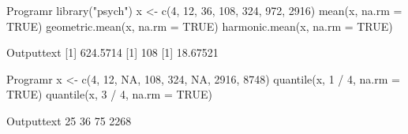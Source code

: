 \begin{code}
    {Program}{r}
library("psych")
x <- c(4, 12, 36, 108, 324, 972, 2916)
mean(x, na.rm = TRUE)
geometric.mean(x, na.rm = TRUE)
harmonic.mean(x, na.rm = TRUE)
\end{code}
\begin{code}
    {Output}{text}
[1] 624.5714
[1] 108
[1] 18.67521
\end{code}

\begin{code}
    {Program}{r}
x <- c(4, 12, NA, 108, 324, NA, 2916, 8748)
quantile(x, 1 / 4, na.rm = TRUE)
quantile(x, 3 / 4, na.rm = TRUE)
\end{code}
\begin{code}
    {Output}{text}
25%
 36
 75%
2268
\end{code}
